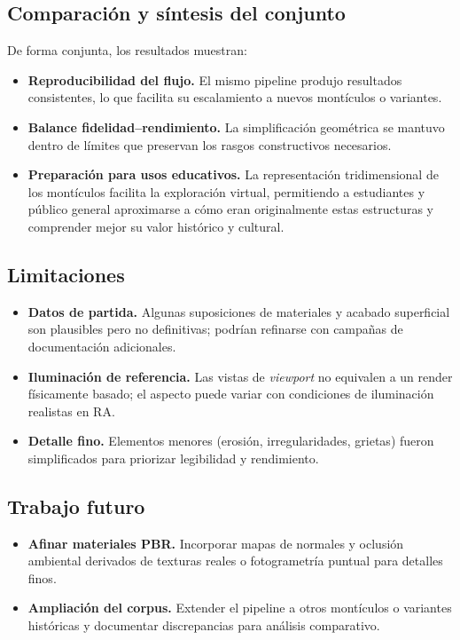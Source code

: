 \subsection{Comparación y síntesis del conjunto}

De forma conjunta, los resultados muestran:
\begin{itemize}
    \item \textbf{Reproducibilidad del flujo.} El mismo pipeline produjo resultados consistentes, lo que facilita su escalamiento a nuevos montículos o variantes.
    \item \textbf{Balance fidelidad–rendimiento.} La simplificación geométrica se mantuvo dentro de límites que preservan los rasgos constructivos necesarios.
    \item \textbf{Preparación para usos educativos.} La representación tridimensional de los montículos facilita la exploración virtual, permitiendo a estudiantes y público general aproximarse a cómo eran originalmente estas estructuras y comprender mejor su valor histórico y cultural.
\end{itemize}

\subsection{Limitaciones}

\begin{itemize}
    \item \textbf{Datos de partida.} Algunas suposiciones de materiales y acabado superficial son plausibles pero no definitivas; podrían refinarse con campañas de documentación adicionales.
    \item \textbf{Iluminación de referencia.} Las vistas de \emph{viewport} no equivalen a un render físicamente basado; el aspecto puede variar con condiciones de iluminación realistas en RA.
    \item \textbf{Detalle fino.} Elementos menores (erosión, irregularidades, grietas) fueron simplificados para priorizar legibilidad y rendimiento.
\end{itemize}

\subsection{Trabajo futuro}

\begin{itemize}
    \item \textbf{Afinar materiales PBR.} Incorporar mapas de normales y oclusión ambiental derivados de texturas reales o fotogrametría puntual para detalles finos.
    \item \textbf{Ampliación del corpus.} Extender el pipeline a otros montículos o variantes históricas y documentar discrepancias para análisis comparativo.
\end{itemize}

